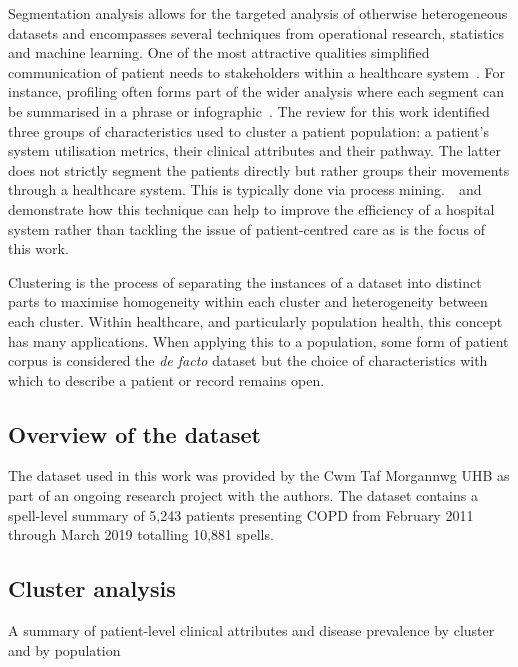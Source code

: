 Segmentation analysis allows for the targeted analysis of otherwise
heterogeneous datasets and encompasses several techniques from
operational research, statistics and machine learning. One of the most
attractive qualities simplified
communication of patient needs to stakeholders within a healthcare
system~\cite{VMD2016review, YGHT+12020}. For instance, profiling often forms
part of the wider analysis where each segment can be summarised in a phrase or
infographic~\cite{VMD2016, YSKT+42019}. The review for this work identified
three groups of characteristics used to cluster a patient population: a
patient's system utilisation metrics, their clinical attributes and their
pathway. The latter does not strictly segment the patients directly but rather
groups their movements through a healthcare system. This is typically done via
process mining.~\cite{AG2018}~and~\cite{DDGM+12015} demonstrate how this
technique can help to improve the efficiency of a hospital system rather than
tackling the issue of patient-centred care as is the focus of this work.

Clustering is the process of separating the instances of a dataset into distinct
parts to maximise homogeneity within each cluster and heterogeneity between each
cluster. Within healthcare, and particularly population health, this concept has
many applications. When applying this to a population, some form of patient
corpus is considered the \emph{de facto} dataset but the choice of
characteristics with which to describe a patient or record remains open.

\subsection{Overview of the dataset}\label{subsec:overview}

The dataset used in this work was provided by the Cwm Taf Morgannwg UHB as part
of an ongoing research project with the authors. The dataset contains a
spell-level summary of 5,243 patients presenting COPD from February 2011 through
March 2019 totalling 10,881 spells. 

\subsection{Cluster analysis}\label{subsec:clusters}

\begin{table}
    \centering
    \resizebox{\textwidth}{!}{%
        
    }\caption{A summary of patient-level clinical attributes and disease
    prevalence by cluster and by population}\label{tab:summary}
\end{table}

